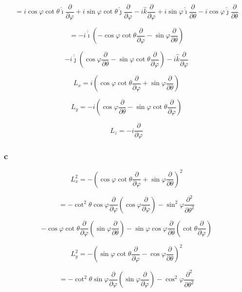 \documentclass[12pt]{article}
\begin{document}
\[
    = i \cos{\varphi} \cot{\theta} \hat{\dot{\imath}} \frac{\partial}{\partial \varphi}
    + i \sin{\varphi} \cot{\theta} \hat{\dot{\jmath}} \frac{\partial}{\partial \varphi}
    - i \hat{k} \frac{\partial}{\partial \varphi}
    + i \sin{\varphi} \hat{\dot{\imath}} \frac{\partial}{\partial \theta}
    - i \cos{\varphi} \hat{\dot{\jmath}} \frac{\partial}{\partial \theta}
\]

\[
    = - i \hat{\dot{\imath}}
    \left(
    -\cos{\varphi} \cot{\theta}\frac{\partial}{\partial \varphi}
    - \sin{\varphi} \frac{\partial}{\partial \theta}
    \right)
\]

\[
    - i \hat{\dot{\jmath}}
    \left(
    \cos{\varphi} \frac{\partial}{\partial \theta}
    -\sin{\varphi} \cot{\theta}\frac{\partial}{\partial \varphi}
    \right)
    - i \hat{k} \frac{\partial}{\partial \varphi}
\]

\[
    L_x = i
    \left(
    \cos{\varphi} \cot{\theta}\frac{\partial}{\partial \varphi}
    + \sin{\varphi} \frac{\partial}{\partial \theta}
    \right)
\]

\[
    L_y = - i
    \left(
    \cos{\varphi} \frac{\partial}{\partial \theta}
    -\sin{\varphi} \cot{\theta}\frac{\partial}{\partial \varphi}
    \right)
\]

\[
    L_z = - i \frac{\partial}{\partial \varphi}
\]

\subsubsection{c}

\[
    L_x^2 =
    -{\left(
    \cos{\varphi} \cot{\theta}\frac{\partial}{\partial \varphi}
    + \sin{\varphi} \frac{\partial}{\partial \theta}
    \right)}^2
\]

\[
    = - \cot^2{\theta} \cos{\varphi} \frac{\partial}{\partial \varphi}
    \left(\cos{\varphi} \frac{\partial}{\partial \varphi}\right)
    - \sin^2{\varphi} \frac{\partial^2}{\partial \theta^2}
\]

\[
    - \cos{\varphi} \cot{\theta}\frac{\partial}{\partial \varphi}
    \left(\sin{\varphi} \frac{\partial}{\partial \theta}\right)
    - \sin{\varphi} \cos{\varphi} \frac{\partial}{\partial \theta}
    \left(\cot{\theta}\frac{\partial}{\partial \varphi}\right)
\]

\[
    L_y^2 =
    -{\left(
    \sin{\varphi} \cot{\theta}\frac{\partial}{\partial \varphi}
    - \cos{\varphi} \frac{\partial}{\partial \theta}
    \right)}^2
\]

\[
    = - \cot^2{\theta} \sin{\varphi} \frac{\partial}{\partial \varphi}
    \left(\sin{\varphi} \frac{\partial}{\partial \varphi}\right)
    - \cos^2{\varphi} \frac{\partial^2}{\partial \theta^2}
\]
\end{document}
